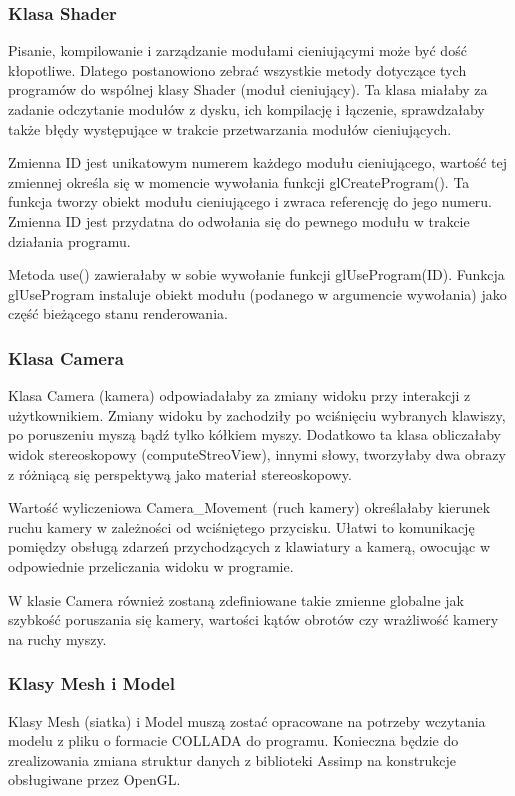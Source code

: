 \subsubsection{Klasa Shader}
Pisanie, kompilowanie i zarządzanie modułami cieniującymi może być dość kłopotliwe. Dlatego postanowiono zebrać wszystkie metody dotyczące tych programów do wspólnej klasy Shader (moduł cieniujący). Ta klasa miałaby za zadanie odczytanie modułów z dysku, ich kompilację i łączenie, sprawdzałaby także błędy występujące w trakcie przetwarzania modułów cieniujących.

Zmienna ID jest unikatowym numerem każdego modułu cieniującego, wartość tej zmiennej określa się w momencie wywołania funkcji glCreateProgram(). Ta funkcja tworzy obiekt modułu cieniującego i zwraca referencję do jego numeru. Zmienna ID jest przydatna do odwołania się do pewnego modułu w trakcie działania programu.

Metoda use() zawierałaby w sobie wywołanie funkcji glUseProgram(ID). Funkcja glUseProgram instaluje obiekt modułu (podanego w argumencie wywołania) jako część bieżącego stanu renderowania.

\subsubsection{Klasa Camera}
Klasa Camera (kamera) odpowiadałaby za zmiany widoku przy interakcji z użytkownikiem. Zmiany widoku by zachodziły po wciśnięciu wybranych klawiszy, po poruszeniu myszą bądź tylko kółkiem myszy. Dodatkowo ta klasa obliczałaby widok stereoskopowy (computeStreoView), innymi słowy, tworzyłaby dwa obrazy z różniącą się perspektywą jako materiał stereoskopowy.

Wartość wyliczeniowa Camera\_Movement (ruch kamery) określałaby kierunek ruchu kamery w zależności od wciśniętego przycisku. Ułatwi to komunikację pomiędzy obsługą zdarzeń przychodzących z klawiatury a kamerą, owocując w odpowiednie przeliczania widoku w programie.

W klasie Camera również zostaną zdefiniowane takie zmienne globalne jak szybkość poruszania się kamery, wartości kątów obrotów czy wrażliwość kamery na ruchy myszy.

\subsubsection{Klasy Mesh i Model}
Klasy Mesh (siatka) i Model muszą zostać opracowane na potrzeby wczytania modelu z pliku o formacie COLLADA do programu. Konieczna będzie do zrealizowania zmiana struktur danych z biblioteki Assimp na konstrukcje obsługiwane przez OpenGL.

